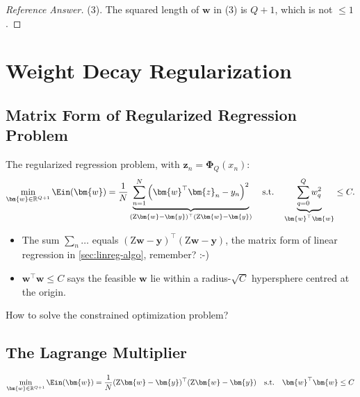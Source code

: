 \begin{proof}[Reference Answer]
    (3). The squared length of \(\bm{w}\) in (3) is \(Q + 1\), which is not
    \(\le 1\).
\end{proof}

\section{Weight Decay Regularization}\label{sec:weight-decay}


\subsection{Matrix Form of Regularized Regression Problem}

The regularized regression problem, with \(\bm{z}_n = \bm{\Phi}_Q(x_n)\):
\[
    \min_{\bm{w} \in \mathbb{R}^{Q+1}} \Ein(\bm{w}) = \frac{1}{N}
    \underbrace{\sum_{n=1}^{N} \left( \bm{w}^\top \bm{z}_n - y_n
    \right)^2}_{(\mathrm{Z}\bm{w} - \bm{y})^\top (\mathrm{Z}\bm{w} - \bm{y})}
    \quad \text{s.t.} \quad \underbrace{\sum_{q=0}^{Q} w_q^2}_{\bm{w}^\top
    \bm{w}} \le C .
\]
\begin{itemize}
    \item The sum \(\sum_n \ldots\) equals \((\mathrm{Z}\bm{w} -
        \bm{y})^\top (\mathrm{Z}\bm{w} - \bm{y})\), the matrix form of linear
        regression in \autoref{sec:linreg-algo}, remember? :-)
    \item \(\bm{w}^\top \bm{w} \le C\) says the feasible \(\bm{w}\) lie within
        a radius-\(\sqrt{C}\) hypersphere centred at the origin.
\end{itemize}

\begin{question}
    How to solve the constrained optimization problem?
\end{question}

\subsection{The Lagrange Multiplier}

\[
    \min_{\bm{w} \in \mathbb{R}^{Q+1}} \Ein(\bm{w}) = \frac{1}{N} (\mathrm{Z}
    \bm{w} - \bm{y})^\top (\mathrm{Z}\bm{w} - \bm{y}) \quad \text{s.t.} \quad
    \bm{w}^\top \bm{w} \le C
\]

\begin{center}
\end{center}

